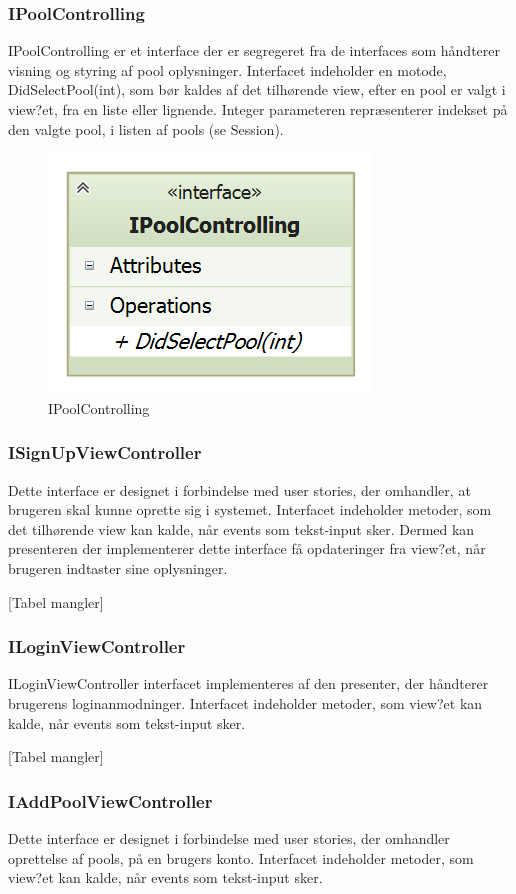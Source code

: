 \subsubsection{IPoolControlling}
IPoolControlling er et interface der er segregeret fra de interfaces som håndterer visning og styring af pool oplysninger. Interfacet indeholder en motode, DidSelectPool(int), som bør kaldes af det tilhørende view, efter en pool er valgt i view?et, fra en liste eller lignende. Integer parameteren repræsenterer indekset på den valgte pool, i listen af pools (se Session).  
\begin{figure}
	\centering
	\includegraphics[width=0.3\linewidth]{figs/design/application_ipoolcontrolling}
	\caption{IPoolControlling}
	\label{fig:application_ipoolcontrolling}
\end{figure}

\subsubsection{ISignUpViewController}
Dette interface er designet i forbindelse med user stories, der omhandler, at brugeren skal kunne oprette sig i systemet. Interfacet indeholder metoder, som det tilhørende view kan kalde, når events som tekst-input sker. Dermed kan presenteren der implementerer dette interface få opdateringer fra view?et, når brugeren indtaster sine oplysninger.

[Tabel mangler]

\subsubsection{ILoginViewController}
ILoginViewController interfacet implementeres af den presenter, der håndterer brugerens loginanmodninger. Interfacet indeholder metoder, som view?et kan kalde, når events som tekst-input sker.

[Tabel mangler]

\subsubsection{IAddPoolViewController}
Dette interface er designet i forbindelse med user stories, der omhandler oprettelse af pools, på en brugers konto. Interfacet indeholder metoder, som view?et kan kalde, når events som tekst-input sker.

